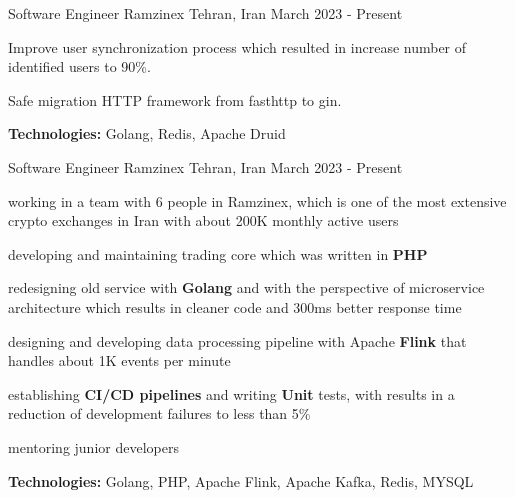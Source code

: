 

\begin{cventries}


  \cventry
    {Software Engineer} %
    {Ramzinex} %
    {Tehran, Iran} %
    {March 2023 - Present} %
    {
      \begin{cvitems} %
        \item Improve user synchronization process which resulted in increase number of identified users to 90\%.
        \item Safe migration HTTP framework from fasthttp to gin.
        \item \textbf{Technologies:} Golang, Redis, Apache Druid
      \end{cvitems}
    }

    
  \cventry
    {Software Engineer} %
    {Ramzinex} %
    {Tehran, Iran} %
    {March 2023 - Present} %
    {
      \begin{cvitems} %
        \item working in a team with 6 people in Ramzinex, which is one of the most extensive crypto exchanges in Iran with about 200K monthly active users
        \item developing and maintaining trading core which was written in \textbf{PHP}
        \item redesigning old service with \textbf{Golang} and with the perspective of microservice architecture which results in cleaner code and 300ms better response time
        \item designing and developing data processing pipeline with Apache \textbf{Flink} that handles about 1K events per minute
        \item establishing \textbf{CI/CD pipelines} and writing \textbf{Unit} tests, with results in a reduction of development failures to less than 5\%
        \item mentoring junior developers
        \item \textbf{Technologies:} Golang, PHP, Apache Flink, Apache Kafka, Redis, MYSQL
      \end{cvitems}
    }


\end{cventries}
